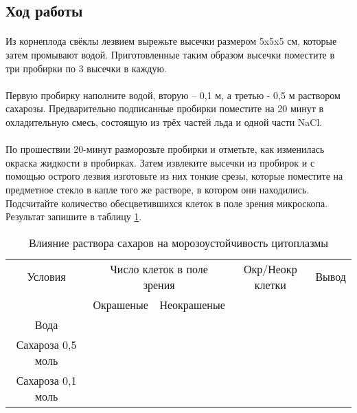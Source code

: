 \subsection*{Ход работы}

\paragraph*{}Из корнеплода свёклы лезвием вырежьте высечки размером 5x5x5 см, которые затем промывают водой. Приготовленные таким образом высечки поместите в три пробирки по 3 высечки в каждую.

\paragraph*{}Первую пробирку наполните водой, вторую – 0,1 м, а третью - 0,5 м раствором сахарозы. Предварительно подписанные пробирки поместите на 20 минут в охладительную смесь, состоящую из трёх частей льда и одной части NaCl.

\paragraph*{}По прошествии 20-минут разморозьте пробирки и отметьте, как изменилась окраска жидкости в пробирках. Затем извлеките высечки из пробирок и с помощью острого лезвия изготовьте из них тонкие срезы, которые поместите на предметное стекло в капле того же растворе, в котором они находились. Подсчитайте количество обесцветившихся клеток в поле зрения микроскопа. Результат запишите в таблицу \ref{plasmolis_table}.

\begin{table}[h!]
\centering
\label{plasmolis_table}
\caption{Влияние раствора сахаров на морозоустойчивость цитоплазмы}
	\begin{tabular}{|c|c|c|c|c|}
	
		\hline Условия &	\multicolumn{2}{c|}{Число клеток в поле зрения} & Окр/Неокр клетки & Вывод \\ \cline{2-5}
		 & Окрашеные & Неокрашеные & & \\
		\hline Вода & & & & \\
		\hline Сахароза 0,5 моль & & & & \\
		\hline Сахароза 0,1 моль & & & & \\
		\hline
	
	\end{tabular}
\end{table}
